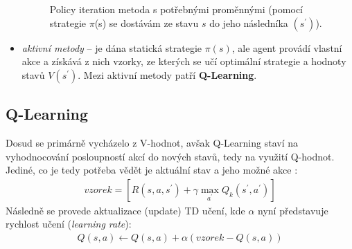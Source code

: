 \begin{itemize}
  \begin{figure}[!htbp]
  \begin{center}
    \caption{Policy iteration metoda s potřebnými proměnnými (pomocí strategie $\pi$(s) se dostávám ze stavu $s$ do jeho následníka $(s^\prime)$).}
    \label{img:policyeval}
  \end{center}
  \end{figure}

  \item \textit{aktivní metody} -- je dána statická strategie $\pi(s)$, ale agent provádí vlastní akce a získává z nich vzorky, ze kterých se učí optimální strategie a hodnoty stavů $V(s^\prime)$. Mezi aktivní metody patří \textbf{Q-Learning}.
\end{itemize}

\subsection*{Q-Learning}
Dosud se primárně vycházelo z V-hodnot, avšak Q-Learning staví na vyhodnocování posloupností akcí do nových stavů, tedy na využití Q-hodnot. Jediné, co je tedy potřeba vědět je aktuální stav a jeho možné akce \cite{RLIntro}:
\begin{align}
vzorek = \left [ R(s,a,s^\prime)+\gamma \max_{a^\prime}Q_{k}(s^\prime,a^\prime) \right]
\end{align}
Následně se provede aktualizace (update) TD učení, kde $\alpha$ nyní představuje rychlost učení (\textit{learning rate}):
\begin{align}
 Q(s,a) \leftarrow  Q(s,a) + \alpha(vzorek - Q(s,a))
\end{align}


